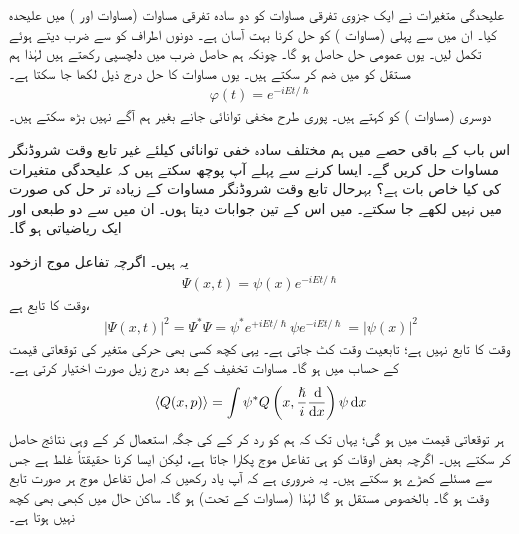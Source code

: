 علیحدگی متغیرات نے ایک جزوی تفرقی مساوات کو دو سادہ تفرقی مساوات (مساوات  اور ) میں علیحدہ کیا۔ ان میں سے پہلی  (مساوات ) کو حل کرنا بہت آسان ہے۔ دونوں اطراف کو  سے ضرب دیتے ہوئے تکمل لیں۔ یوں عمومی حل  حاصل ہو گا۔ چونکہ ہم   حاصل ضرب میں دلچسپی رکھتے ہیں لہٰذا ہم مستقل   کو    میں ضم کر سکتے ہیں۔ یوں مساوات  کا حل درج ذیل لکھا جا سکتا ہے۔ 
\begin{align}
\varphi(t) = e^{-iEt/\hslash}
\end{align}
دوسری  (مساوات )  کو  کہتے ہیں۔ پوری طرح مخفی توانائی  جانے بغیر ہم آگے نہیں بڑھ سکتے ہیں۔

اس باب کے باقی حصے میں ہم  مختلف سادہ خفی توانائی کیلئے غیر تابع وقت شروڈنگر مساوات حل کریں گے۔ ایسا کرنے سے پہلے آپ پوچھ سکتے ہیں کہ علیحدگی متغیرات کی کیا خاص بات ہے؟ بہرحال تابع وقت شروڈنگر مساوات کے زیادہ تر حل   کی صورت میں نہیں لکھے جا سکتے۔ میں اس کے تین جوابات دیتا ہوں۔ ان میں سے دو طبعی اور ایک ریاضیاتی ہو گا۔ 

\quad 
یہ  ہیں۔ اگرچہ تفاعل موج ازخود 
\begin{align}\label{مساوات_شروڈنگر_غیر_تابع_اور_تابع}
\Psi (x,t) = \psi (x) e^{-iEt/\hslash}
\end{align}
وقت  کا تابع ہے،  
\begin{align}
\left| \Psi (x,t) \right|^{2} = \Psi^{*}\Psi = \psi^{*}e^{+iEt/\hslash} \psi e^{-iEt/\hslash} = \left| \psi (x) \right|^{2}
\end{align}
وقت کا تابع نہیں ہے؛ تابعیت وقت کٹ جاتی ہے۔ یہی کچھ کسی بھی حرکی متغیر کی توقعاتی قیمت کے حساب میں ہو گا۔ مساوات  تخفیف کے بعد درج زیل صورت اختیار کرتی ہے۔ 
\begin{align}
\langle Q(x,p) \rangle = \int \psi^{*} Q \left( x, \frac{\hslash}{i} \frac{\dif}{\dif x} \right) \psi \dif x
\end{align}
ہر توقعاتی قیمت  میں  ہو گی؛ یہاں تک کہ ہم   کو رد کر کے   کی
 جگہ   استعمال کر کے وہی نتائج حاصل کر سکتے ہیں۔ اگرچہ بعض اوقات    کو ہی تفاعل موج پکارا جاتا ہے، لیکن ایسا کرنا حقیقتاً غلط ہے جس سے مسئلے کھڑے ہو سکتے ہیں۔ یہ ضروری ہے کہ آپ یاد رکھیں کہ اصل تفاعل موج ہر صورت تابع وقت ہو گا۔ بالخصوص   مستقل  ہو گا لہٰذا (مساوات  کے تحت)     ہو گا۔ ساکن حال میں کبھی بھی کچھ نہیں ہوتا ہے۔ 

